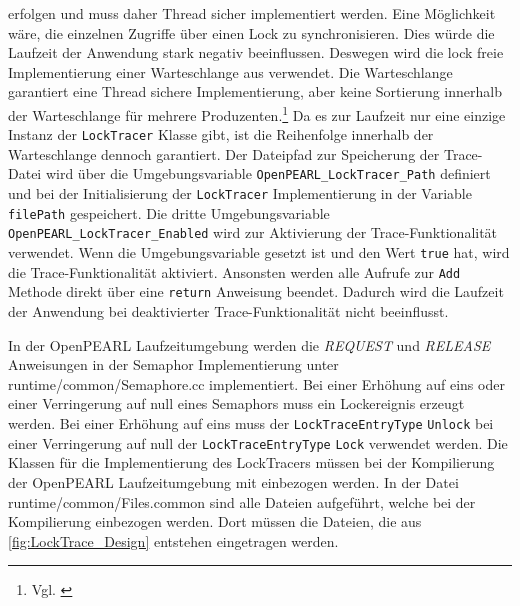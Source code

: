 erfolgen und muss daher Thread sicher implementiert werden. Eine Möglichkeit
wäre, die einzelnen Zugriffe über einen Lock zu synchronisieren. Dies würde die
Laufzeit der Anwendung stark negativ beeinflussen. Deswegen wird die lock freie
Implementierung einer Warteschlange aus \autocite{Moody_Camels_Concurrentqueue}
verwendet. Die Warteschlange garantiert eine Thread sichere Implementierung,
aber keine Sortierung innerhalb der Warteschlange für mehrere
Produzenten.\footnote{Vgl. \autocite{Moody_Camels_Concurrentqueue}} Da es zur
Laufzeit nur eine einzige Instanz der \texttt{Lock\-Tracer} Klasse gibt, ist die
Reihenfolge innerhalb der Warteschlange dennoch garantiert. Der Dateipfad zur
Speicherung der Trace-Datei wird über die Umgebungsvariable
\texttt{OpenPEARL\_LockTracer\_Path} definiert und bei der Initialisierung der
\texttt{LockTracer} Implementierung in der Variable \texttt{filePath}
gespeichert. Die dritte Umgebungsvariable
\texttt{OpenPEARL\_LockTracer\_Enabled} wird zur Aktivierung der
Trace-Funktionalität verwendet. Wenn die Umgebungsvariable gesetzt ist und den
Wert \texttt{true} hat, wird die Trace-Funktionalität aktiviert. Ansonsten
werden alle Aufrufe zur \texttt{Add} Methode direkt über eine \texttt{return}
Anweisung beendet. Dadurch wird die Laufzeit der Anwendung bei deaktivierter
Trace-Funktionalität nicht beeinflusst.

In der OpenPEARL Laufzeitumgebung werden die \emph{REQUEST} und \emph{RELEASE}
Anweisungen in der Semaphor Implementierung unter runtime/common/Semaphore.cc
implementiert. Bei einer Erhöhung auf eins oder einer Verringerung auf null
eines Semaphors muss ein Lockereignis erzeugt werden. Bei einer Erhöhung auf
eins muss der \texttt{Lock\-Trace\-Entry\-Type} \texttt{Unlock} bei einer
Verringerung auf null der \texttt{Lock\-Trace\-Entry\-Type} \texttt{Lock}
verwendet werden. Die Klassen für die Implementierung des LockTracers müssen bei
der Kompilierung der OpenPEARL Laufzeitumgebung mit einbezogen werden. In der
Datei runtime/common/Files.common sind alle Dateien aufgeführt, welche bei der
Kompilierung einbezogen werden. Dort müssen die Dateien, die aus
\cref{fig:LockTrace_Design} entstehen eingetragen werden.

